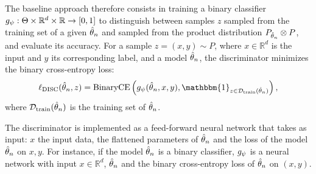The baseline approach therefore consists in training a binary classifier $g_\psi: \Theta \times \mathbb{R}^d \times \mathbb{R} \rightarrow [0,1]$ to distinguish between samples $z$ sampled from the training set of a given ${\hat{\theta}_n}$ and sampled from the product distribution $P_{{\hat{\theta}_n}}\otimes P$, and evaluate its accuracy.
For a sample $z=(x,y)\sim P$, where $x\in \mathbb{R}^d$ is the input and $y$ its corresponding label, and a model ${\hat{\theta}_n}$, the discriminator minimizes the binary cross-entropy loss:
\[
    \ell_{\textrm{DISC}}(\thetan, z) = \text{BinaryCE}\left(\bsl(\thetan, x, y), \mathbbm{1}_{z\in \mathcal{D}_{\textrm{train}}(\thetan)}\right),
\]
where $\mathcal{D}_{\textrm{train}}({\hat{\theta}_n})$ is the training set of ${\hat{\theta}_n}$.

The discriminator is implemented as a feed-forward neural network that takes as input: $x$ the input data, the flattened parameters of ${\hat{\theta}_n}$ and the loss of the model ${\hat{\theta}_n}$ on $x,y$.
For instance, if the model ${\hat{\theta}_n}$ is a binary classifier, $g_\psi$ is a neural network with input $x\in \mathbb{R}^d$, ${\hat{\theta}_n}$ and the binary cross-entropy loss of ${\hat{\theta}_n}$ on $(x,y)$.

